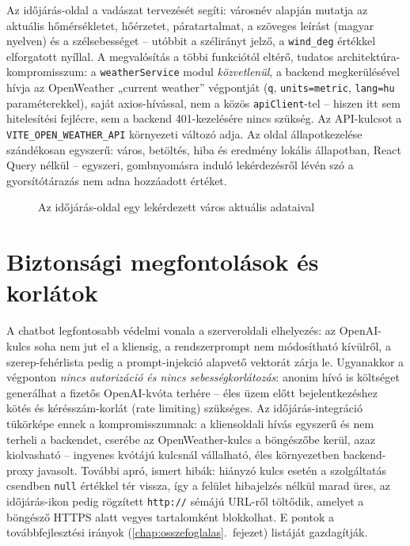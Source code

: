Az időjárás-oldal a vadászat tervezését segíti: városnév alapján mutatja az aktuális
hőmérsékletet, hőérzetet, páratartalmat, a szöveges leírást (magyar nyelven) és a szélsebességet
-- utóbbit a szélirányt jelző, a \texttt{wind\_deg} értékkel elforgatott nyíllal. A megvalósítás
a többi funkciótól eltérő, tudatos architektúra-kompromisszum: a \texttt{weatherService} modul
\emph{közvetlenül}, a backend megkerülésével hívja az OpenWeather „current weather” végpontját
(\texttt{q}, \texttt{units=metric}, \texttt{lang=hu} paraméterekkel), saját axios-hívással, nem a
közös \texttt{apiClient}-tel -- hiszen itt sem hitelesítési fejlécre, sem a backend 401-kezelésére
nincs szükség. Az API-kulcsot a \texttt{VITE\_OPEN\_WEATHER\_API} környezeti változó adja. Az
oldal állapotkezelése szándékosan egyszerű: város, betöltés, hiba és eredmény lokális
állapotban, React Query nélkül -- egyszeri, gombnyomásra induló lekérdezésről lévén szó a
gyorsítótárazás nem adna hozzáadott értéket.

\begin{figure}[htbp]
	\centering
	\caption{Az időjárás-oldal egy lekérdezett város aktuális adataival}
	\label{fig:weather-screen}
\end{figure}

\section{Biztonsági megfontolások és korlátok}
\label{sec:chat-korlatok}

A chatbot legfontosabb védelmi vonala a szerveroldali elhelyezés: az OpenAI-kulcs soha nem jut el
a kliensig, a rendszerprompt nem módosítható kívülről, a szerep-fehérlista pedig a
prompt-injekció alapvető vektorát zárja le. Ugyanakkor a végponton \emph{nincs autorizáció és
nincs sebességkorlátozás}: anonim hívó is költséget generálhat a fizetős OpenAI-kvóta terhére --
éles üzem előtt bejelentkezéshez kötés és kérésszám-korlát (rate limiting) szükséges. Az
időjárás-integráció tükörképe ennek a kompromisszumnak: a kliensoldali hívás egyszerű és nem
terheli a backendet, cserébe az OpenWeather-kulcs a böngészőbe kerül, azaz kiolvasható -- ingyenes
kvótájú kulcsnál vállalható, éles környezetben backend-proxy javasolt. További apró, ismert
hibák: hiányzó kulcs esetén a szolgáltatás csendben \texttt{null} értékkel tér vissza, így a
felület hibajelzés nélkül marad üres, az időjárás-ikon pedig rögzített \texttt{http://} sémájú
URL-ről töltődik, amelyet a böngésző HTTPS alatt vegyes tartalomként blokkolhat. E pontok a
továbbfejlesztési irányok (\ref{chap:osszefoglalas}.~fejezet) listáját gazdagítják.
